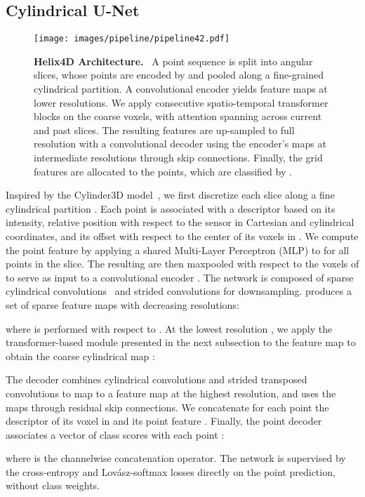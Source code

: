 \documentclass[runningheads]{tpls/llncs}
\begin{document}
\subsection{Cylindrical U-Net}
\begin{figure*}[t]
    \centering
    \texttt{[image: images/pipeline/pipeline42.pdf]}
    \caption{\textbf{Helix4D Architecture.}~
    A point sequence is split into angular slices, whose points are encoded by  and pooled along a fine-grained cylindrical partition. A convolutional encoder  yields feature maps at lower resolutions. We apply  consecutive spatio-temporal transformer blocks
     on the coarse voxels, with attention spanning across current and past slices.
    The resulting {features}
    are up-sampled to full resolution with a convolutional decoder  using the encoder's maps at intermediate resolutions through skip connections. Finally, the grid features are allocated to the points, which are classified by .}
    \label{fig:pipeline}
\end{figure*}
Inspired by the Cylinder3D model~\cite{zhu2021cylindrical}, we first discretize each slice along a fine cylindrical partition . Each point  is associated with a descriptor  based on its intensity, relative position with respect to the sensor in Cartesian and cylindrical coordinates, and its offset with respect to the center of its voxels in .  
We compute the point feature  by applying a shared Multi-Layer Perceptron (MLP)  to  for all points  in the slice. The resulting  are then maxpooled with respect to the voxels of  to serve as input to a convolutional encoder . The network  is composed of sparse cylindrical convolutions~\cite{SubmanifoldSparseConvNet} and strided convolutions for downsampling.  produces a set of  sparse feature maps  with decreasing resolutions:

where  is performed with respect to .
At the lowest resolution , we apply the transformer-based module  presented in the next subsection to the feature map  to obtain the coarse cylindrical map :

The decoder  combines cylindrical convolutions and strided transposed convolutions to map  to a feature map  at the highest resolution, and uses the maps  through residual skip connections.
We concatenate for each point  the descriptor  of its voxel in  and its point feature . Finally, the point decoder  associates a vector of class scores   with each point :

where  is the channelwise concatenation operator. The network is supervised by the cross-entropy and Lov\'asz-softmax \cite{berman2018lovasz} losses directly on the point prediction, without class weights.
\end{document}
